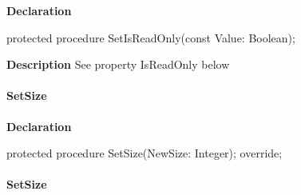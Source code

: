 \documentclass{report}
\newif\ifpdf
\begin{document}
\label{PasDoc_StreamUtils.TBufferedStream-SetIsReadOnly}
\begin{list}{}{
\setlength{\itemindent}{0cm}
\setlength{\listparindent}{0cm}
\setlength{\leftmargin}{\evensidemargin}
\addtolength{\leftmargin}{\tmplength}
\settowidth{\labelsep}{X}
\addtolength{\leftmargin}{\labelsep}
\setlength{\labelwidth}{\tmplength}
}
\item[\textbf{Declaration}\hfill]
\ifpdf
\begin{flushleft}
\fi
\begin{ttfamily}
protected procedure SetIsReadOnly(const Value: Boolean);\end{ttfamily}

\ifpdf
\end{flushleft}
\fi

\par
\item[\textbf{Description}]
See property IsReadOnly below

\end{list}
\paragraph*{SetSize}\hspace*{\fill}

\label{PasDoc_StreamUtils.TBufferedStream-SetSize}
\begin{list}{}{
\setlength{\itemindent}{0cm}
\setlength{\listparindent}{0cm}
\setlength{\leftmargin}{\evensidemargin}
\addtolength{\leftmargin}{\tmplength}
\settowidth{\labelsep}{X}
\addtolength{\leftmargin}{\labelsep}
\setlength{\labelwidth}{\tmplength}
}
\item[\textbf{Declaration}\hfill]
\ifpdf
\begin{flushleft}
\fi
\begin{ttfamily}
protected procedure SetSize(NewSize: Integer); override;\end{ttfamily}

\ifpdf
\end{flushleft}
\fi

\end{list}
\paragraph*{SetSize}\hspace*{\fill}
\end{document}
